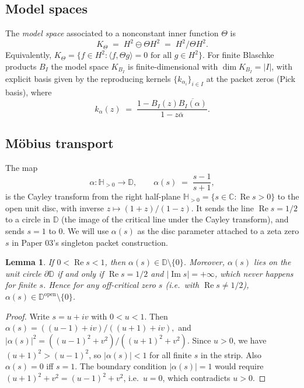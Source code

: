 \documentclass[12pt]{article}
\newtheorem{lemma}[theorem]{Lemma}
\theoremstyle{definition}
\theoremstyle{remark}
\newcommand{\C}{\mathbb{C}}
\newcommand{\Disc}{\mathbb{D}}
\newcommand{\HardyTwo}{H^{2}}
\newcommand{\re}{\operatorname{Re}}
\newcommand{\im}{\operatorname{Im}}
\begin{document}
\subsection{Model spaces}

The \emph{model space} associated to a nonconstant inner function $\Theta$
is
\begin{equation}\label{eq:model-space}
K_{\Theta} \;=\; \HardyTwo \ominus \Theta\HardyTwo
\;=\; \HardyTwo / \Theta\HardyTwo .
\end{equation}
Equivalently,
$K_{\Theta} = \{f\in\HardyTwo : \langle f, \Theta g\rangle = 0
\text{ for all } g\in\HardyTwo\}$.
For finite Blaschke products $B_{I}$ the model space $K_{B_{I}}$ is
finite-dimensional with $\dim K_{B_{I}} = |I|$, with explicit basis given
by the reproducing kernels $\{k_{\alpha_{i}}\}_{i\in I}$ at the packet
zeros (Pick basis), where
\begin{equation}\label{eq:pick}
k_{\alpha}(z)\;=\;\frac{1-B_{I}(z)\overline{B_{I}(\alpha)}}{1-z\overline{\alpha}}.
\end{equation}

\subsection{Möbius transport}

The map
\begin{equation}\label{eq:mobius}
\alpha : \mathbb{H}_{>0} \to \Disc, \qquad
\alpha(s) \;=\; \frac{s-1}{s+1},
\end{equation}
is the Cayley transform from the right half-plane
$\mathbb{H}_{>0} = \{s\in\C : \re s > 0\}$ to the open unit disc, with
inverse $z \mapsto (1+z)/(1-z)$. It sends the line
$\re s = 1/2$ to a circle in $\Disc$ (the image of the critical line under
the Cayley transform), and sends $s=1$ to $0$. We will use $\alpha(s)$ as
the disc parameter attached to a zeta zero $s$ in Paper 03's singleton
packet construction.

\begin{lemma}\label{lem:mobius-strip}
If $0<\re s<1$, then $\alpha(s)\in\Disc\setminus\{0\}$. Moreover,
$\alpha(s)$ lies on the unit circle $\partial\Disc$ if and only if
$\re s = 1/2$ \emph{and} $|\im s| = +\infty$, which never happens for
finite $s$. Hence for any off-critical zero $s$ (\emph{i.e.}\ with
$\re s \neq 1/2$), $\alpha(s)\in\Disc^{\mathrm{open}}\setminus\{0\}$.
\end{lemma}

\begin{proof}
Write $s = u + iv$ with $0 < u < 1$. Then
\(
\alpha(s) = ((u-1)+iv)/((u+1)+iv),
\)
and
\(
|\alpha(s)|^{2}
= ((u-1)^{2}+v^{2})/((u+1)^{2}+v^{2}).
\)
Since $u>0$, we have $(u+1)^{2} > (u-1)^{2}$, so $|\alpha(s)|<1$ for all
finite $s$ in the strip. Also $\alpha(s)=0$ iff $s=1$. The boundary
condition $|\alpha(s)|=1$ would require
$(u+1)^{2}+v^{2} = (u-1)^{2}+v^{2}$, i.e.\ $u=0$, which contradicts
$u>0$.
\end{proof}
\end{document}
